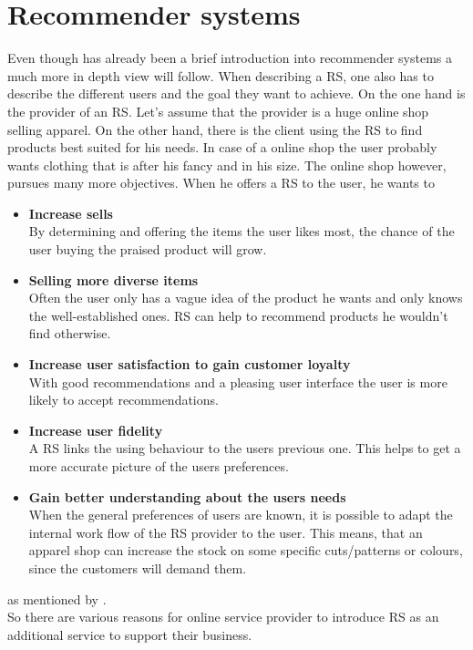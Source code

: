 

\section{Recommender systems}

Even though has already been a brief introduction into recommender systems a much more in depth view will follow.
When describing a RS, one also has to describe the different users and the goal they want to achieve.
On the one hand is the provider of an RS.
Let's assume that the provider is a huge online shop selling apparel.
On the other hand, there is the client using the RS to find products best suited for his needs.
In case of a online shop the user probably wants clothing that is after his fancy and in his size.
The online shop however, pursues many more objectives.
When he offers a RS to the user, he wants to
\begin{itemize}
    \item\textbf{Increase sells}\hfill\\
        By determining and offering the items the user likes most, the chance of the user buying the praised product will grow.
    \item\textbf{Selling more diverse items}\hfill\\
        Often the user only has a vague idea of the product he wants and only knows the well-established ones.
        RS can help to recommend products he wouldn't find otherwise.
    \item\textbf{Increase user satisfaction to gain customer loyalty}\hfill\\
        With good recommendations and a pleasing user interface the user is more likely to accept recommendations.
    \item\textbf{Increase user fidelity}\hfill\\
        A RS links the using behaviour to the users previous one.
        This helps to get a more accurate picture of the users preferences.
    \item\textbf{Gain better understanding about the users needs}\hfill\\
        When the general preferences of users are known, it is possible to adapt the internal work flow of the RS provider to the user.
        This means, that an apparel shop can increase the stock on some specific cuts/patterns or colours, since the customers will demand them.
\end{itemize}
as mentioned by \citeauthor[p.~4-5]{ricci:2011}.\\
So there are various reasons for online service provider to introduce RS as an additional service to support their business.

